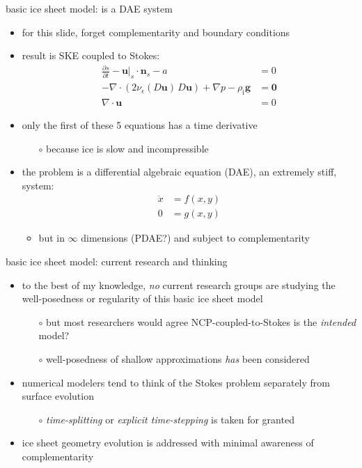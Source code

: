 \documentclass[svgnames,
               hyperref={colorlinks,citecolor=DeepPink4,linkcolor=FireBrick,urlcolor=Maroon},
               usepdftitle=false]  %
               {beamer}
\newcommand{\eps}{\epsilon}
\newcommand{\bn}{\mathbf{n}}
\newcommand{\bu}{\mathbf{u}}
\newcommand{\bzero}{\bm{0}}
\newcommand{\rhoi}{\rho_{\text{i}}}
\begin{document}
\begin{frame}{basic ice sheet model: is a DAE system}

\begin{itemize}
\item for this slide, forget complementarity and boundary conditions
\item result is SKE coupled to Stokes:
\begin{align*}
\frac{\partial s}{\partial t} - \bu|_s \cdot \bn_s - a &= 0 \\
- \nabla \cdot \left(2 \nu_\eps(D\bu)\, D\bu\right) + \nabla p - \rhoi \mathbf{g} &= \bzero \\
\nabla \cdot \bu &= 0
\end{align*}

\item<2-> only the first of these 5 equations has a time derivative
    \begin{itemize}
    \item[$\circ$] because ice is slow and incompressible
    \end{itemize}
\item<3> the problem is a \alert{differential algebraic equation} (DAE), an extremely \alert{stiff}, system:
\begin{align*}
\dot x &= f(x,y) \\
     0 &= g(x,y)
\end{align*}

    \begin{itemize}
    \item<3>[$\circ$] but in $\infty$ dimensions (PDAE?) and subject to complementarity
    \end{itemize}
\end{itemize}
\end{frame}


\begin{frame}{basic ice sheet model: current research and thinking}

\begin{itemize}
\item to the best of my knowledge, \emph{no} current research groups are studying the well-posedness or regularity of this basic ice sheet model
    \begin{itemize}
    \item[$\circ$] but most researchers would agree NCP-coupled-to-Stokes is the \emph{intended} model?
    \item[$\circ$] well-posedness of shallow approximations \emph{has} been considered
    \end{itemize}

\medskip
\item<2> numerical modelers tend to think of the Stokes problem separately from surface evolution
    \begin{itemize}
    \item[$\circ$] \emph{time-splitting} or \emph{explicit time-stepping} is taken for granted
    \end{itemize}
\item<2> ice sheet geometry evolution is addressed with minimal awareness of complementarity
\end{itemize}
\end{frame}
\end{document}
